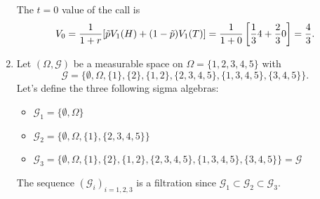 \documentclass[11pt,a4,table]{article}
\begin{document}
\begin{enumerate}
    The $t=0$ value of the call is
    \begin{equation*}
        V_0 = \frac{1}{1+r}[\Tilde{p}V_1(H)+(1-\Tilde{p})V_1(T)] = \frac{1}{1+0} \left[\frac{1}{3}4+\frac{2}{3}0\right] = \frac{4}{3}.
    \end{equation*}
    
    
    \item Let $(\Omega,\mathcal{G})$ be a measurable space on $\Omega=\{1,2,3,4,5\}$ with
    \begin{equation*}
        \mathcal{G}=\{\emptyset, \Omega, \{1\},\{2\},\{1,2\},\{2,3,4,5\},\{1,3,4,5\},\{3,4,5\}\}.
    \end{equation*}
    Let's define the three following sigma algebras:
    \begin{itemize}
        \item $\mathcal{G}_1=\{\emptyset,\Omega\}$
        
        \item $\mathcal{G}_2=\{\emptyset,\Omega,\{1\},\{2,3,4,5\}\}$
        
        \item $\mathcal{G}_3=\{\emptyset,\Omega,\{1\},\{2\},\{1,2\},\{2,3,4,5\},\{1,3,4,5\},\{3,4,5\}\}=\mathcal{G}$
    \end{itemize}
    The sequence $(\mathcal{G}_i)_{i=1,2,3}$ is a filtration since $\mathcal{G}_1\subset \mathcal{G}_2\subset \mathcal{G}_3$.
    
\end{enumerate}
\end{document}
